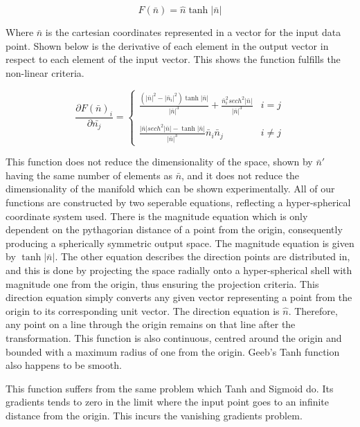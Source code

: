 \documentclass[onecolumn]{article}
\begin{document}
    \begin{equation}
        \label{eqn: Geebs' Tanh Function} 
        F\left(\bar{n}\right)=\hat{n}\tanh|\bar{n}|
    \end{equation}

    Where $\bar{n}$ is the cartesian coordinates represented in a vector for the input data point. Shown below is the derivative of each element in the output vector in respect to each element of the input vector. This shows the function fulfills the non-linear criteria.

    \[\frac{\partial F\left(\bar{n}\right)_{i}}{\partial \bar{n_{j}}}=\left\{
    \begin{array}{ll}
        \frac{\left(|\bar{n}|^{2}-|\bar{n}_{i}|^{2}\right)\tanh|\bar{n}|}{|\bar{n}|^{3}} + \frac{\bar{n}_{i}^{2}sech^{2}|\bar{n}|}{|\bar{n}|^{3}} & i = j \\\\
        \frac{|\bar{n}|sech^{2}|\bar{n}|-\tanh|\bar{n}|}{|\bar{n}|^{3}}\bar{n}_{i}\bar{n}_{j} & i \neq j
    \end{array} 
    \right. \]

    This function does not reduce the dimensionality of the space, shown by $\bar{n}'$ having the same number of elements as $\bar{n}$, and it does not reduce the dimensionality of the manifold which can be shown experimentally. All of our functions are constructed by two seperable equations, reflecting a hyper-spherical coordinate system used. There is the magnitude equation which is only dependent on the pythagorian distance of a point from the origin, consequently producing a spherically symmetric output space. The magnitude equation is given by $\tanh|\bar{n}|$. The other equation describes the direction points are distributed in, and this is done by projecting the space radially onto a hyper-spherical shell with magnitude one from the origin, thus ensuring the projection criteria. This direction equation simply converts any given vector representing a point from the origin to its corresponding unit vector. The direction equation is $\hat{n}$. Therefore, any point on a line through the origin remains on that line after the transformation. This function is also continuous, centred around the origin and bounded with a maximum radius of one from the origin. Geeb's Tanh function also happens to be smooth.
    
    This function suffers from the same problem which Tanh and Sigmoid do. Its gradients tends to zero in the limit where the input point goes to an infinite distance from the origin. This incurs the vanishing gradients problem.
\end{document}
